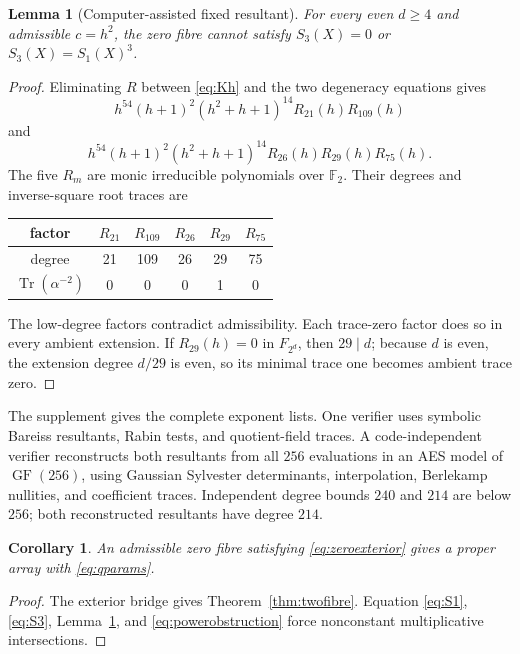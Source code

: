 \documentclass[11pt]{article}
\newtheorem{lemma}[theorem]{Lemma}
\newtheorem{corollary}[theorem]{Corollary}
\theoremstyle{definition}\newtheorem{definition}[theorem]{Definition}
\theoremstyle{remark}\newtheorem{remark}[theorem]{Remark}
\DeclareMathOperator{\Tr}{Tr}
\DeclareMathOperator{\GF}{GF}
\newcommand{\F}{\mathbb F}
\begin{document}
\begin{lemma}[Computer-assisted fixed resultant]
\label{lem:resultant}
For every even \(d\geq4\) and admissible \(c=h^2\), the zero fibre cannot
satisfy \(S_3(X)=0\) or \(S_3(X)=S_1(X)^3\).
\end{lemma}
\begin{proof}
Eliminating \(R\) between \eqref{eq:Kh} and the two degeneracy equations gives
\begin{equation}
 h^{54}(h+1)^2(h^2+h+1)^{14}R_{21}(h)R_{109}(h)
 \label{eq:res0}
\end{equation}
and
\begin{equation}
 h^{54}(h+1)^2(h^2+h+1)^{14}
 R_{26}(h)R_{29}(h)R_{75}(h).
 \label{eq:res1}
\end{equation}
The five \(R_m\) are monic irreducible polynomials over \(\F_2\).  Their
degrees and inverse-square root traces are
\begin{center}
\begin{tabular}{c@{\quad}ccccc}
\toprule
factor & \(R_{21}\) & \(R_{109}\) & \(R_{26}\) & \(R_{29}\) & \(R_{75}\)\\
\midrule
degree & 21 & 109 & 26 & 29 & 75\\
\(\Tr(\alpha^{-2})\) & 0 & 0 & 0 & 1 & 0\\
\bottomrule
\end{tabular}
\end{center}
The low-degree factors contradict admissibility.  Each trace-zero factor does
so in every ambient extension.  If \(R_{29}(h)=0\) in \(F_{2^d}\), then
\(29\mid d\); because \(d\) is even, the extension degree \(d/29\) is even,
so its minimal trace one becomes ambient trace zero.
\end{proof}

The supplement gives the complete exponent lists.  One verifier uses symbolic
Bareiss resultants, Rabin tests, and quotient-field traces.  A code-independent
verifier reconstructs both resultants from all \(256\) evaluations in an AES
model of \(\GF(256)\), using Gaussian Sylvester determinants, interpolation,
Berlekamp nullities, and coefficient traces.  Independent degree bounds
\(240\) and \(214\) are below \(256\); both reconstructed resultants have
degree \(214\).

\begin{corollary}
\label{cor:proper}
An admissible zero fibre satisfying \eqref{eq:zeroexterior} gives a proper
array with \eqref{eq:qparams}.
\end{corollary}
\begin{proof}
The exterior bridge gives Theorem~\ref{thm:twofibre}.  Equation
\eqref{eq:S1}, \eqref{eq:S3}, Lemma~\ref{lem:resultant}, and
\eqref{eq:powerobstruction} force nonconstant multiplicative intersections.
\end{proof}
\end{document}
